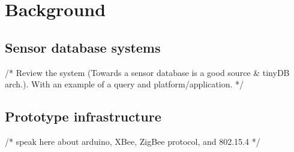\section{Background}\label{sec:background}

\subsection{Sensor database systems}
/* Review the system (Towards a sensor database is a good source \& tinyDB arch.). With an example of a query and platform/application. */

\subsection{Prototype infrastructure}
/* speak here about arduino, XBee, ZigBee protocol, and 802.15.4 */
